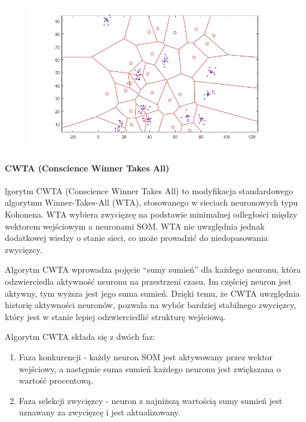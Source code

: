 \documentclass[11pt]{article}
\providecommand{\tightlist}{%
      \setlength{\itemsep}{0pt}\setlength{\parskip}{0pt}}
\begin{document}
\begin{figure}[h]
  \includegraphics{screeny/WTA/WTA_10_object/WTA_Areas.jpg}
\end{figure}

\hypertarget{cwta-conscience-winner-takes-all}{%
\paragraph{CWTA (Conscience Winner Takes
All)}\label{cwta-conscience-winner-takes-all}}

lgorytm CWTA (Conscience Winner Takes All) to modyfikacja standardowego
algorytmu Winner-Takes-All (WTA), stosowanego w sieciach neuronowych
typu Kohonena. WTA wybiera zwycięzcę na podstawie minimalnej odległości
między wektorem wejściowym a neuronami SOM. WTA nie uwzględnia jednak
dodatkowej wiedzy o stanie sieci, co może prowadzić do niedopasowania
zwycięzcy.

Algorytm CWTA wprowadza pojęcie ``sumy sumień'' dla każdego neuronu,
która odzwierciedla aktywność neuronu na przestrzeni czasu. Im częściej
neuron jest aktywny, tym wyższa jest jego suma sumień. Dzięki temu, że
CWTA uwzględnia historię aktywności neuronów, pozwala na wybór bardziej
stabilnego zwycięzcy, który jest w stanie lepiej odzwierciedlić
strukturę wejściową.

Algorytm CWTA składa się z dwóch faz:

\begin{enumerate}
\def\labelenumi{\arabic{enumi}.}
\tightlist
\item
  Faza konkurencji - każdy neuron SOM jest aktywowany przez wektor
  wejściowy, a następnie suma sumień każdego neuronu jest zwiększana o
  wartość procentową.
\item
  Faza selekcji zwycięzcy - neuron z najniższą wartością sumy sumień
  jest uznawany za zwycięzcę i jest aktualizowany.
\end{enumerate}
\end{document}
